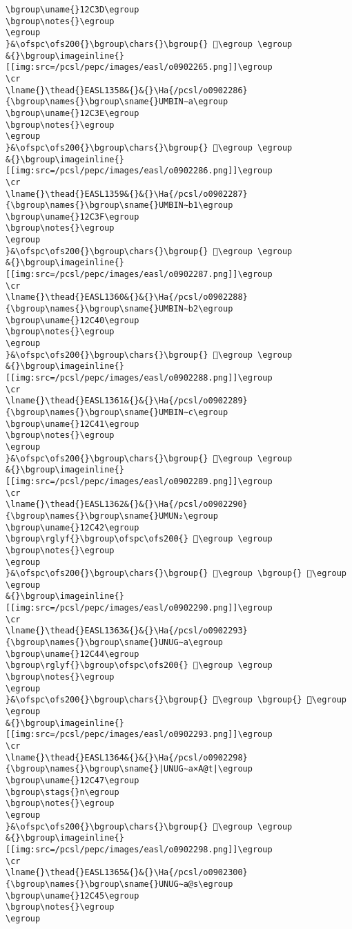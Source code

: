 \begin{verbatim}
\bgroup\uname{}12C3D\egroup
\bgroup\notes{}\egroup
\egroup
}&\ofspc\ofs200{}\bgroup\chars{}\bgroup{} 𒰽\egroup \egroup
&{}\bgroup\imageinline{}[[img:src=/pcsl/pepc/images/easl/o0902265.png]]\egroup
\cr
\lname{}\thead{}EASL1358&{}&{}\Ha{/pcsl/o0902286}{\bgroup\names{}\bgroup\sname{}UMBIN∼a\egroup
\bgroup\uname{}12C3E\egroup
\bgroup\notes{}\egroup
\egroup
}&\ofspc\ofs200{}\bgroup\chars{}\bgroup{} 𒰾\egroup \egroup
&{}\bgroup\imageinline{}[[img:src=/pcsl/pepc/images/easl/o0902286.png]]\egroup
\cr
\lname{}\thead{}EASL1359&{}&{}\Ha{/pcsl/o0902287}{\bgroup\names{}\bgroup\sname{}UMBIN∼b1\egroup
\bgroup\uname{}12C3F\egroup
\bgroup\notes{}\egroup
\egroup
}&\ofspc\ofs200{}\bgroup\chars{}\bgroup{} 𒰿\egroup \egroup
&{}\bgroup\imageinline{}[[img:src=/pcsl/pepc/images/easl/o0902287.png]]\egroup
\cr
\lname{}\thead{}EASL1360&{}&{}\Ha{/pcsl/o0902288}{\bgroup\names{}\bgroup\sname{}UMBIN∼b2\egroup
\bgroup\uname{}12C40\egroup
\bgroup\notes{}\egroup
\egroup
}&\ofspc\ofs200{}\bgroup\chars{}\bgroup{} 𒱀\egroup \egroup
&{}\bgroup\imageinline{}[[img:src=/pcsl/pepc/images/easl/o0902288.png]]\egroup
\cr
\lname{}\thead{}EASL1361&{}&{}\Ha{/pcsl/o0902289}{\bgroup\names{}\bgroup\sname{}UMBIN∼c\egroup
\bgroup\uname{}12C41\egroup
\bgroup\notes{}\egroup
\egroup
}&\ofspc\ofs200{}\bgroup\chars{}\bgroup{} 𒱁\egroup \egroup
&{}\bgroup\imageinline{}[[img:src=/pcsl/pepc/images/easl/o0902289.png]]\egroup
\cr
\lname{}\thead{}EASL1362&{}&{}\Ha{/pcsl/o0902290}{\bgroup\names{}\bgroup\sname{}UMUN₂\egroup
\bgroup\uname{}12C42\egroup
\bgroup\rglyf{}\bgroup\ofspc\ofs200{} 𒱂\egroup \egroup
\bgroup\notes{}\egroup
\egroup
}&\ofspc\ofs200{}\bgroup\chars{}\bgroup{} 𒱃\egroup \bgroup{} 𒱂\egroup \egroup
&{}\bgroup\imageinline{}[[img:src=/pcsl/pepc/images/easl/o0902290.png]]\egroup
\cr
\lname{}\thead{}EASL1363&{}&{}\Ha{/pcsl/o0902293}{\bgroup\names{}\bgroup\sname{}UNUG∼a\egroup
\bgroup\uname{}12C44\egroup
\bgroup\rglyf{}\bgroup\ofspc\ofs200{} 𒱄\egroup \egroup
\bgroup\notes{}\egroup
\egroup
}&\ofspc\ofs200{}\bgroup\chars{}\bgroup{} 𒱆\egroup \bgroup{} 𒱄\egroup \egroup
&{}\bgroup\imageinline{}[[img:src=/pcsl/pepc/images/easl/o0902293.png]]\egroup
\cr
\lname{}\thead{}EASL1364&{}&{}\Ha{/pcsl/o0902298}{\bgroup\names{}\bgroup\sname{}|UNUG∼a×A@t|\egroup
\bgroup\uname{}12C47\egroup
\bgroup\stags{}n\egroup
\bgroup\notes{}\egroup
\egroup
}&\ofspc\ofs200{}\bgroup\chars{}\bgroup{} 𒱇\egroup \egroup
&{}\bgroup\imageinline{}[[img:src=/pcsl/pepc/images/easl/o0902298.png]]\egroup
\cr
\lname{}\thead{}EASL1365&{}&{}\Ha{/pcsl/o0902300}{\bgroup\names{}\bgroup\sname{}UNUG∼a@s\egroup
\bgroup\uname{}12C45\egroup
\bgroup\notes{}\egroup
\egroup

\end{verbatim}
